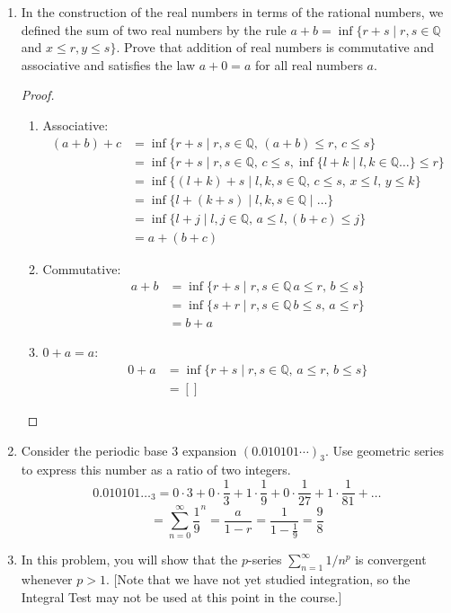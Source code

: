 \documentclass[hidelinks,12pt]{article}
\renewcommand{\leq}{\leqslant}
\newcommand{\Q}{\mathbb{Q}}
\begin{document}
\begin{enumerate}
\item In the construction of the real numbers in terms of the rational numbers, we defined the sum of two real numbers by the rule $a+b=\inf \{r+s \mid r, s \in \mathbb{Q}$ and $x \leq r, y \leq s\}$. Prove that addition of real numbers is commutative and associative and satisfies the law $a+0=a$ for all real numbers $a$.
  \begin{proof}[Proof]
    \begin{enumerate}
      \item Associative: \begin{align*}
          (a+b)+c&=\inf\{r+s\mid r,s\in\Q,\,(a+b)\leq r,\,c\leq s\}\\
                 &=\inf\{r+s\mid r,s\in\Q,\,c\leq s, \inf\{l+k\mid l,k\in\Q\dots\}\leq r\}\\
                 &=\inf\{(l+k)+s\mid l,k,s\in\Q,\,c\leq s,\,x\leq l,\,y\leq k\}\tag{$x$ and $y$ came from second addition}\\
                 &=\inf\{l+(k+s)\mid l,k,s\in\Q\mid \dots\}\tag{By definition of rationals}\\
                 &=\inf\{l+j\mid l,j\in\Q,\,a\leq l, (b+c)\leq j\}\\
                 &=a+(b+c)
      \end{align*}
    \item Commutative:\begin{align*}
        a+b&=\inf\{r+s\mid r,s\in\Q\,a\leq r,\,b\leq s\}\\
           &=\inf\{s+r\mid r,s\in\Q\,b\leq s,\,a\leq r\}\\
           &=b+a
    \end{align*}
  \item $0+a=a$:
    \begin{align*}
      0+a&=\inf\{r+s\mid r,s\in\Q,\,a\leq r,\,b\leq s\}\\
         &=[]
    \end{align*}
    \end{enumerate}
  \end{proof}
\item Consider the periodic base 3 expansion $(0.010101 \cdots)_3$. Use geometric series to express this number as a ratio of two integers.
  \[0.010101\dots_3=0\cdot3+0\cdot\frac{1}{3}+1\cdot\frac{1}{9}+0\cdot\frac{1}{27}+1\cdot\frac{1}{81}+\dots\]
\[=\sum_{n=0}^{\infty}\frac{1}{9}^n=\frac{a}{1-r}=\frac{1}{1-\frac{1}{9}}=\frac{9}{8}\]
\item In this problem, you will show that the $p$-series $\sum_{n=1}^{\infty} 1 / n^p$ is convergent whenever $p>1$. [Note that we have not yet studied integration, so the Integral Test may not be used at this point in the course.]

\end{enumerate}
\end{document}
